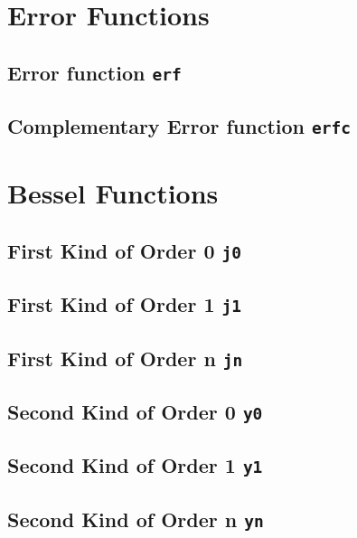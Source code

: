 \documentclass[a4paper]{book}
\theoremstyle{definition}
\theoremstyle{remark}
\begin{document}
\section{Error Functions}
\subsection{Error function {\texttt{erf}}}
\subsection{Complementary Error function {\texttt{erfc}}}

\section{Bessel Functions}
\subsection{First Kind of Order 0 {\texttt{j0}}}
\subsection{First Kind of Order 1 {\texttt{j1}}}
\subsection{First Kind of Order n {\texttt{jn}}}
\subsection{Second Kind of Order 0 {\texttt{y0}}}
\subsection{Second Kind of Order 1 {\texttt{y1}}}
\subsection{Second Kind of Order n {\texttt{yn}}}




\end{document}

